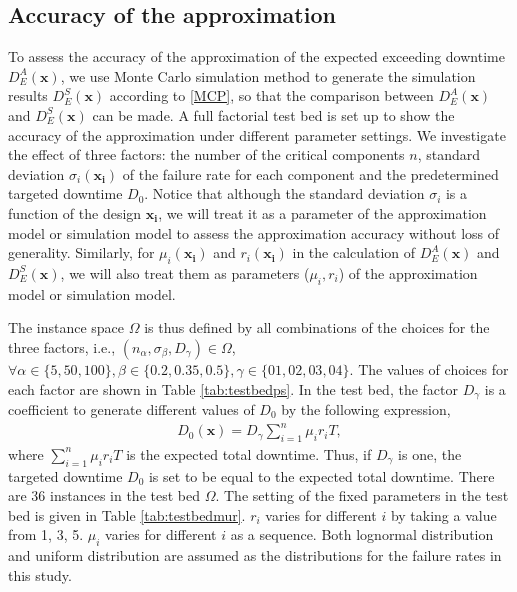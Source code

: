 \documentclass[preprint,12pt]{elsarticle}
\begin{document}
\subsection{Accuracy of the approximation}
To assess the accuracy of the approximation of the expected exceeding downtime $D_{E}^{A}(\boldsymbol{x})$, we use Monte Carlo simulation method to generate the simulation results $D_{E}^{S}(\boldsymbol{x})$ according to \ref{MCP}, so that the comparison between $D_{E}^{A}(\boldsymbol{x})$ and $D_{E}^{S}(\boldsymbol{x})$ can be made. A full factorial test bed is set up to show the accuracy of the approximation under different parameter settings. We investigate the effect of three factors: the number of the critical components $n$, standard deviation $\sigma_{i}(\boldsymbol{x_i})$ of the failure rate for each component and the predetermined targeted downtime $D_{0}$. Notice that although the standard deviation $\sigma_i$ is a function of the design $\boldsymbol{x_i}$, we will treat it as a parameter of the approximation model or simulation model to assess the approximation accuracy without loss of generality. Similarly, for $\mu_i(\boldsymbol{x_i})$ and $r_i(\boldsymbol{x_i})$ in the calculation of $D_{E}^{A}(\boldsymbol{x})$ and $D_{E}^{S}(\boldsymbol{x})$, we will also treat them as parameters ($\mu_i , r_i$) of the approximation model or simulation model. 

The instance space $\Omega$ is thus defined by all combinations of the choices for the three factors, i.e., $(n_{\alpha},\sigma_{\beta},D_{\gamma}) \in \Omega$, $\forall \alpha \in \{5,50,100\}, \beta \in \{0.2,0.35,0.5\}, \gamma \in \{01,02,03,04\}$. The values of choices for each factor are shown in Table \ref{tab:testbedps}. In the test bed, the factor $D_{\gamma}$ is a coefficient to generate different values of $D_0$ by the following expression,
 \begin{eqnarray}
 D_{0}(\boldsymbol{x}) = D_{\gamma}\sum_{i=1}^{n}{\mu_{i} r_{i} T}, \label{D0}
\end{eqnarray}
where $\sum_{i=1}^{n}{\mu_{i} r_{i} T}$ is the expected total downtime. Thus, if $D_{\gamma}$ is one, the targeted downtime $D_0$ is set to be equal to the expected total downtime.
There are 36 instances in the test bed $\Omega$. The setting of the fixed parameters in the test bed is given in Table \ref{tab:testbedmur}. $r_{i}$ varies for different $i$ by taking a value from {1, 3, 5}. $\mu_{i}$ varies for different $i$ as a sequence. Both lognormal distribution and uniform distribution are assumed as the distributions for the failure rates in this study. 
\end{document}
